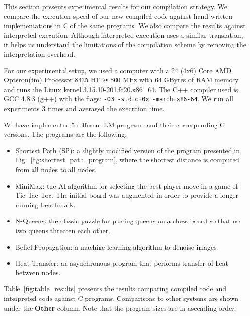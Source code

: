 This section presents experimental results for our compilation strategy.  We
compare the execution speed of our new compiled code against hand-written
implementations in C of the same programs. We also compare the results against
interpreted execution. Although interpreted execution uses a similar
translation, it helps us understand the limitations of the compilation scheme by
removing the interpretation overhead.

For our experimental setup, we used a computer with a 24 (4x6) Core AMD
Opteron(tm) Processor 8425 HE $@$ 800 MHz with 64 GBytes of RAM memory and runs
the Linux kernel 3.15.10-201.fc20.x86\_64. The C++ compiler used is GCC 4.8.3
(g++) with the flags: \texttt{-O3 -std=c+0x
   -march=x86-64}.  We run all experiments 3 times and averaged the
execution time.

We have implemented 5 different LM programs and their corresponding
C versions. The programs are the following:

\begin{itemize}
\item Shortest Path (SP): a slightly modified version of the program
                                  presented in
                                  Fig.~\ref{fig:shortest_path_program}, where
                                  the shortest distance is computed from all
                                  nodes to all nodes.

\item MiniMax: the AI algorithm for selecting the best player move in a game of
Tic-Tac-Toe. The initial board was augmented in order to provide a longer
running benchmark.

\item N-Queens: the classic puzzle for placing queens on a chess board so that
no two queens threaten each other.

\item Belief Propagation: a machine learning algorithm to denoise images.

\item Heat Transfer: an asynchronous program that performs transfer of heat
between nodes.
\end{itemize}

Table~\ref{fig:table_results} presents the results comparing compiled code and
interpreted code against C programs. Comparisons to other systems are shown
under the \textbf{Other} column. Note that the program sizes are in ascending
order.

